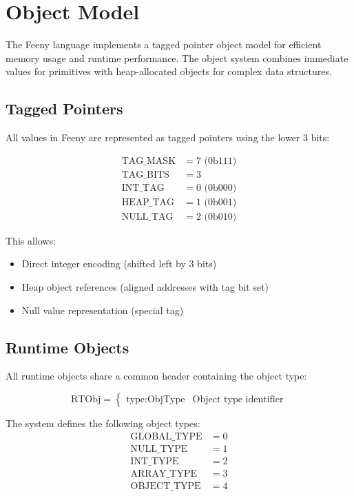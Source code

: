 \documentclass[12pt, a4paper]{article}
\begin{document}
\section{Object Model}

The Feeny language implements a tagged pointer object model for efficient memory usage and runtime performance. The object system combines immediate values for primitives with heap-allocated objects for complex data structures.

\subsection{Tagged Pointers}
All values in Feeny are represented as tagged pointers using the lower 3 bits:

\[
\begin{aligned}
\text{TAG\_MASK} &= 7 \text{ (0b111)} \\
\text{TAG\_BITS} &= 3 \\
\text{INT\_TAG} &= 0 \text{ (0b000)} \\
\text{HEAP\_TAG} &= 1 \text{ (0b001)} \\
\text{NULL\_TAG} &= 2 \text{ (0b010)}
\end{aligned}
\]

This allows:
\begin{itemize}
\item Direct integer encoding (shifted left by 3 bits)
\item Heap object references (aligned addresses with tag bit set)
\item Null value representation (special tag)
\end{itemize}

\subsection{Runtime Objects}
All runtime objects share a common header containing the object type:

\[
\text{RTObj} = \begin{cases}
\text{type}: \text{ObjType} & \text{Object type identifier}
\end{cases}
\]

The system defines the following object types:
\[
\begin{aligned}
\text{GLOBAL\_TYPE} &= 0 \\
\text{NULL\_TYPE} &= 1 \\
\text{INT\_TYPE} &= 2 \\
\text{ARRAY\_TYPE} &= 3 \\
\text{OBJECT\_TYPE} &= 4
\end{aligned}
\]
\end{document}
